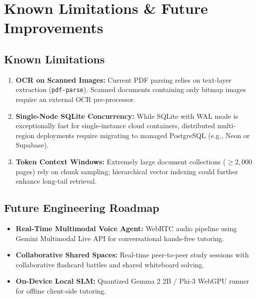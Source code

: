 \documentclass[11pt,a4paper]{article}
\begin{document}
\section{Known Limitations \& Future Improvements}

\subsection{Known Limitations}
\begin{enumerate}[noitemsep]
    \item \textbf{OCR on Scanned Images:} Current PDF parsing relies on text-layer extraction (\texttt{pdf-parse}). Scanned documents containing only bitmap images require an external OCR pre-processor.
    \item \textbf{Single-Node SQLite Concurrency:} While SQLite with WAL mode is exceptionally fast for single-instance cloud containers, distributed multi-region deployments require migrating to managed PostgreSQL (e.g., Neon or Supabase).
    \item \textbf{Token Context Windows:} Extremely large document collections ($\ge 2,000$ pages) rely on chunk sampling; hierarchical vector indexing could further enhance long-tail retrieval.
\end{enumerate}

\subsection{Future Engineering Roadmap}
\begin{itemize}[noitemsep]
    \item \textbf{Real-Time Multimodal Voice Agent:} WebRTC audio pipeline using Gemini Multimodal Live API for conversational hands-free tutoring.
    \item \textbf{Collaborative Shared Spaces:} Real-time peer-to-peer study sessions with collaborative flashcard battles and shared whiteboard solving.
    \item \textbf{On-Device Local SLM:} Quantized Gemma 2 2B / Phi-3 WebGPU runner for offline client-side tutoring.
\end{itemize}

\end{document}
